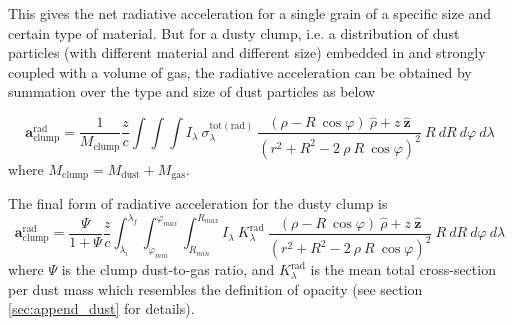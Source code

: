 \documentclass[twocolumn]{aastex62}
\begin{document}
This gives the net radiative acceleration for a single grain of a specific size and certain type of material. But for a dusty clump, i.e. a distribution of dust particles (with different material and different size) embedded in and strongly coupled with a volume of gas, the radiative acceleration can be obtained by summation over the type and size of dust particles as below

\begin{equation}
\label{eq:rad_pres1}
\textbf{a}_{\mathrm{clump}}^{\mathrm{rad}} =
\frac{1}{M_{\mathrm{clump}}}
\frac{z}{c}
\int\int\int
I_{\lambda}\  \sigma_{\lambda}^{\mathrm{tot(rad)}}\ 
\frac{(\rho- R\ \cos\varphi)\ \hat{{\rho}} + z\ \hat{\textbf{z}}}
{( r^2 + R^2 - 2\ \rho\ R\ \cos\varphi ) ^{2}}\  R\ dR\ d\varphi\ d\lambda
\end{equation}
where $M_{\mathrm{clump}}=M_{\mathrm{dust}}+M_{\mathrm{gas}}$.


The final form of radiative acceleration for the dusty clump is
\begin{equation}
\label{eq:rad_pres2}
\textbf{a}_{\mathrm{clump}}^{\mathrm{rad}} =
\frac{\Psi}{1+\Psi} \frac{z}{c}
\int_{\lambda_{i}}^{\lambda_{f}}
\int_{\varphi_{min}}^{\varphi_{max}}
\int_{R_{min}}^{R_{max}}
I_{\lambda}\  K^{\mathrm{rad}}_{\lambda}\
\frac{(\rho- R\ \cos\varphi)\ \hat{{\rho}} + z\ \hat{\textbf{z}}}
{\left( r^2 + R^2 - 2\ \rho\ R\ \cos\varphi \right) ^{2}}\  R\ dR\ d\varphi\ d\lambda
\end{equation}
where $\Psi$ is the clump dust-to-gas ratio, and $K^{\mathrm{rad}}_{\lambda}$ is the mean total cross-section per dust mass which resembles the definition of opacity (see section \ref{sec:append_dust} for details).
\end{document}
